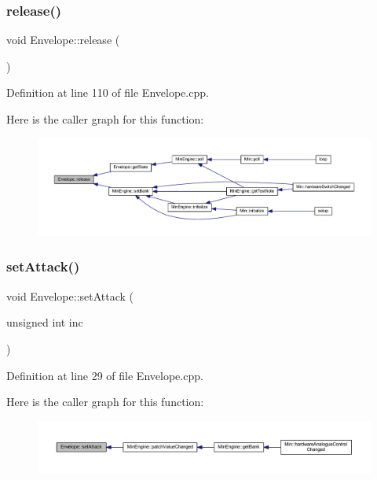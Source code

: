 \subsubsection{\texorpdfstring{release()}{release()}}
{\footnotesize\ttfamily void Envelope\+::release (\begin{DoxyParamCaption}{ }\end{DoxyParamCaption})}



Definition at line 110 of file Envelope.\+cpp.

Here is the caller graph for this function\+:
\nopagebreak
\begin{figure}[H]
\begin{center}
\leavevmode
\includegraphics[width=350pt]{d7/df3/class_envelope_ab21b5747de63336c4a525f3a7e728189_icgraph}
\end{center}
\end{figure}
\mbox{\label{class_envelope_a82398cacd7990d2fdb0606f454610a43}} 
\subsubsection{\texorpdfstring{set\+Attack()}{setAttack()}}
{\footnotesize\ttfamily void Envelope\+::set\+Attack (\begin{DoxyParamCaption}\item[{unsigned int}]{inc }\end{DoxyParamCaption})}



Definition at line 29 of file Envelope.\+cpp.

Here is the caller graph for this function\+:
\nopagebreak
\begin{figure}[H]
\begin{center}
\leavevmode
\includegraphics[width=350pt]{d7/df3/class_envelope_a82398cacd7990d2fdb0606f454610a43_icgraph}
\end{center}
\end{figure}
\mbox{\label{class_envelope_a5ce19b4d570637216cfd8b0c31447d84}} 
